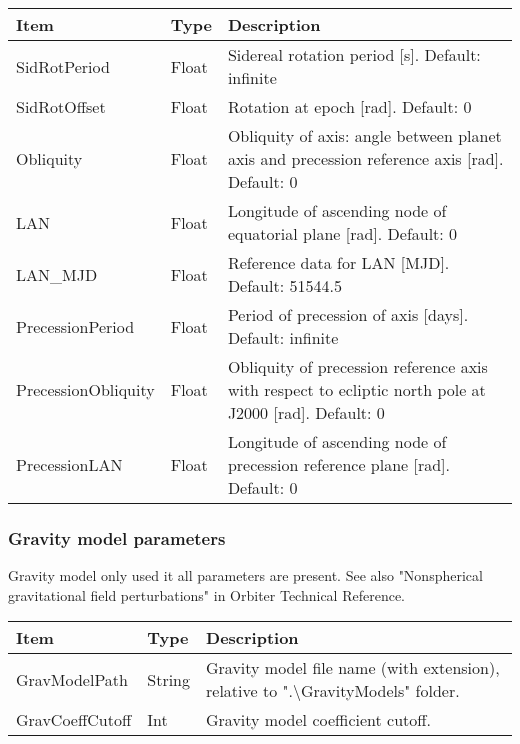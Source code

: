 \documentclass[Orbiter Developer Manual.tex]{subfiles}
\begin{document}
	\begin{longtable}{ |p{}|p{}|p{}| }
	\hline\rule{0pt}{2ex}
	\textbf{Item} & \textbf{Type} & \textbf{Description}\\
	\hline\rule{0pt}{2ex}
	SidRotPeriod & Float & Sidereal rotation period [s]. Default: infinite\\
	\hline\rule{0pt}{2ex}
	SidRotOffset & Float & Rotation at epoch [rad]. Default: 0\\
	\hline\rule{0pt}{2ex}
	Obliquity & Float & Obliquity of axis: angle between planet axis and precession reference axis [rad]. Default: 0\\
	\hline\rule{0pt}{2ex}
	LAN & Float & Longitude of ascending node of equatorial plane [rad]. Default: 0\\
	\hline\rule{0pt}{2ex}
	LAN\_MJD & Float & Reference data for LAN [MJD]. Default: 51544.5\\
	\hline\rule{0pt}{2ex}
	PrecessionPeriod & Float & Period of precession of axis [days]. Default: infinite\\
	\hline\rule{0pt}{2ex}
	PrecessionObliquity & Float & Obliquity of precession reference axis with respect to ecliptic north pole at J2000 [rad]. Default: 0\\
	\hline\rule{0pt}{2ex}
	PrecessionLAN & Float & Longitude of ascending node of precession reference plane [rad]. Default: 0\\
	\hline
	\end{longtable}


\subsubsection*{Gravity model parameters}
Gravity model only used it all parameters are present. See also "Nonspherical gravitational field perturbations" in Orbiter Technical Reference.

	\begin{longtable}{ |p{}|p{}|p{}| }
	\hline\rule{0pt}{2ex}
	\textbf{Item} & \textbf{Type} & \textbf{Description}\\
	\hline\rule{0pt}{2ex}
	GravModelPath & String & Gravity model file name (with extension), relative to ".\textbackslash GravityModels" folder.\\
	\hline\rule{0pt}{2ex}
	GravCoeffCutoff & Int & Gravity model coefficient cutoff.\\
	\hline
	\end{longtable}
\end{document}

